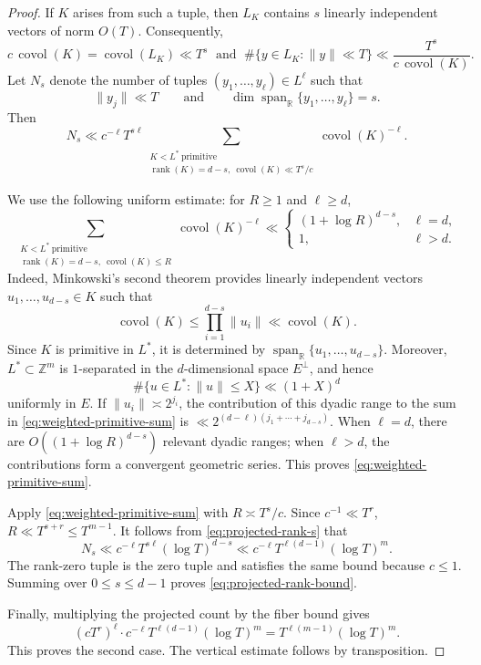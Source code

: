 \documentclass[reqno,11pt]{amsart}
\numberwithin{equation}{section}
\theoremstyle{definition}
\theoremstyle{remark}
\newcommand{\op}{\operatorname}
\newcommand{\rank}{\op{rank}}
\newcommand{\covol}{\op{covol}}
\begin{document}
\begin{proof}
If $K$ arises from such a tuple, then $L_K$ contains $s$ linearly
independent vectors of norm $O(T)$. Consequently,
$$
c\,\covol(K)=\covol(L_K)\ll T^s\; \text{ and }\; 
\#\{y\in L_K:\|y\|\ll T\}
\ll
\frac{T^s}{c\,\covol(K)}.
$$
Let $N_s$ denote the number of tuples
$(y_1,\ldots,y_\ell)\in L^\ell$ such that
$$
\|y_j\|\ll T
\qquad\text{and}\qquad
\dim\operatorname{span}_{\mathbb R}\{y_1,\ldots,y_\ell\}=s.
$$
Then
\begin{equation}\label{eq:projected-rank-s}
N_s
\ll
c^{-\ell}T^{s\ell}
\sum_{\substack{
K< L^*\ \mathrm{primitive}\\
\rank(K)=d-s,\ \covol(K)\ll T^s/c}}
\covol(K)^{-\ell}.
\end{equation}

We use the following uniform estimate: for $R\ge1$ and $\ell\ge d$,
\begin{equation}\label{eq:weighted-primitive-sum}
\sum_{\substack{
K<L^*\ \mathrm{primitive}\\
\rank(K)=d-s,\ \covol(K)\le R}}
\covol(K)^{-\ell}
\ll
\begin{cases}
(1+\log R)^{d-s},&\ell=d,\\
1,&\ell>d.
\end{cases}
\end{equation}
Indeed, Minkowski's second theorem provides linearly independent vectors
$u_1,\ldots,u_{d-s}\in K$ such that
$$
\covol(K)
\le
\prod_{i=1}^{d-s}\|u_i\|
\ll
\covol(K).
$$
Since $K$ is primitive in $L^*$, it is determined by
$\operatorname{span}_{\mathbb R}\{u_1,\ldots,u_{d-s}\}$. Moreover,
$L^*\subset\mathbb Z^m$ is $1$-separated in the $d$-dimensional space
$E^\perp$, and hence
$$
\#\{u\in L^*:\|u\|\le X\}\ll(1+X)^d
$$
uniformly in $E$. If $\|u_i\|\asymp2^{j_i}$, the contribution of this
dyadic range to the sum in \eqref{eq:weighted-primitive-sum} is
$
\ll 2^{(d-\ell)(j_1+\cdots+j_{d-s})}.
$
When $\ell=d$, there are $O((1+\log R)^{d-s})$ relevant dyadic ranges;
when $\ell>d$, the contributions form a convergent geometric series.
This proves \eqref{eq:weighted-primitive-sum}.

Apply \eqref{eq:weighted-primitive-sum} with
$R\asymp T^s/c$. Since $c^{-1}\ll T^r$,
$
R\ll T^{s+r}\le T^{m-1}. $
It follows from \eqref{eq:projected-rank-s} that
$$
N_s
\ll
c^{-\ell}T^{s\ell}(\log T)^{d-s}
\ll
c^{-\ell}T^{\ell(d-1)}(\log T)^m.
$$
The rank-zero tuple is the zero tuple and satisfies the same bound because
$c\le1$. Summing over $0\le s\le d-1$ proves
\eqref{eq:projected-rank-bound}.

Finally, multiplying the projected count by the fiber bound gives
$$
(cT^r)^\ell
\cdot
c^{-\ell}T^{\ell(d-1)}(\log T)^m
=
T^{\ell(m-1)}(\log T)^m.
$$
This proves the second case. The vertical estimate follows by
transposition.
\end{proof}
\end{document}

